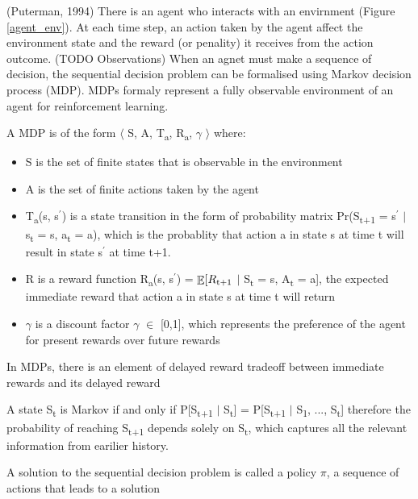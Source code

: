 \documentclass[12pt,twoside]{report}
\DeclareMathOperator{\E}{\mathbb{E}}
\begin{document}
(Puterman, 1994)
There is an agent who interacts with an envirnment (Figure \ref{agent_env}). At each time step, an action taken by the agent affect the environment state and the reward (or penality) it receives from the action outcome. (TODO Observations)
When an agnet must make a sequence of decision, the sequential decision problem can be formalised using Markov decision process (MDP). MDPs formaly represent a fully observable environment of an agent for reinforcement learning.

A MDP is of the form $\langle$ S, A, T\textsubscript{a}, R\textsubscript{a}, $\gamma$ $\rangle$ where: \\

\begin{itemize}
\item S is the set of finite states that is observable in the environment
\item A is the set of finite actions taken by the agent
\item T\textsubscript{a}(s, s$^\prime$) is a state transition in the form of probability matrix Pr(S\textsubscript{t+1} = s$^\prime$ $\vert$ s\textsubscript{t} = s, a\textsubscript{t} = a), which is the probablity that action a in state s at time t will result in state s$^\prime$ at time t+1.
\item R is a reward function R\textsubscript{a}(s, s$^\prime$) = $\displaystyle \E[R\textsubscript{t+1} $ $\vert$ S\textsubscript{t} = s, A\textsubscript{t} = a], the expected immediate reward that action a in state s at time t will return
\item $\gamma$ is a discount factor $\gamma$ $\in$ [0,1], which represents the preference of the agent for present rewards over future rewards

\end{itemize}

In MDPs, there is an element of delayed reward tradeoff between immediate rewards and its delayed reward

A state S\textsubscript{t} is Markov if and only if
P[S\textsubscript{t+1} $\vert$ S\textsubscript{t}] = P[S\textsubscript{t+1} $\vert$ S\textsubscript{1}, ..., S\textsubscript{t}] therefore the probability of reaching S\textsubscript{t+1} depends solely on S\textsubscript{t}, which captures all the relevant information from earilier history.

A solution to the sequential decision problem is called a policy $\pi$, a sequence of actions that leads to a solution
\end{document}
